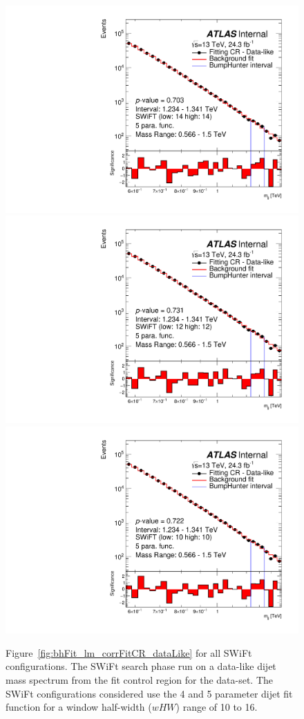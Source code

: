 \begin{figure}[!htb]
{}
 {
  \includegraphics[width=0.35\linewidth, angle=0]{figs/Dibjet/LowMass/FitStudy_min566/bhFit_corrFitCR_dataLike_v13_5para_low14_high14.pdf}
}
 {
  \includegraphics[width=0.35\linewidth, angle=0]{figs/Dibjet/LowMass/FitStudy_min566/bhFit_corrFitCR_dataLike_v13_5para_low12_high12.pdf}
}
 {
  \includegraphics[width=0.35\linewidth, angle=0]{figs/Dibjet/LowMass/FitStudy_min566/bhFit_corrFitCR_dataLike_v13_5para_low10_high10.pdf}
}
\vspace{10pt}
\caption[Figure~\ref{fig:bhFit_lm_corrFitCR_dataLike} for all SWiFt configurations.]
{\label{fig:app-bhFit_lm_corrFitCR_dataLike}
  Figure~\ref{fig:bhFit_lm_corrFitCR_dataLike} for all SWiFt configurations.
  The SWiFt search phase run on a data-like dijet mass spectrum
  from the fit control region for the \lm{} data-set.
  The SWiFt configurations considered use the 4 and 5 parameter dijet fit function for a window half-width ($wHW$) range of 10 to 16.
}
\end{figure}


